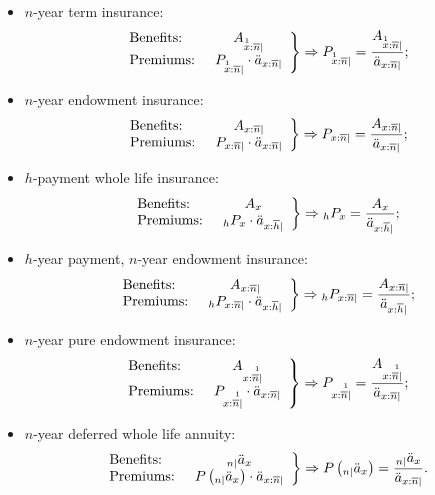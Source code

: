\documentclass[11pt,fleqn,oneside]{book}
\begin{document}
\begin{itemize}
\item $n$-year term insurance:
$$
\left.
\begin{array}{l c}
\text{Benefits: }  & A_{\stackrel{1}{x}:\overline{n}|}\\
\text{Premiums: }  & P_{\stackrel{1}{x}:\overline{n}|}\cdot \ddot{a}_{x:\overline{n}|}
\end{array}
\right\} \Rightarrow P_{\stackrel{1}{x}:\overline{n}|} = \frac{A_{\stackrel{1}{x}:\overline{n}|}}{\ddot{a}_{x:\overline{n}|}};
$$
\item $n$-year endowment insurance:
$$
\left.
\begin{array}{l c}
\text{Benefits: }  & A_{x:\overline{n}|}\\
\text{Premiums: }  &P_{x:\overline{n}|} \cdot  \ddot{a}_{x:\overline{n}|}
\end{array}
\right\} \Rightarrow P_{x:\overline{n}|} = \frac{A_{x:\overline{n}|}}{\ddot{a}_{x:\overline{n}|}};
$$
\item $h$-payment whole life insurance:\\
$$
\left.
\begin{array}{l c}
\text{Benefits: }  & A_{x}\\
\text{Premiums: }  & {_hP_{x}} \cdot \ddot{a}_{x:\overline{h}|}
\end{array}
\right\} \Rightarrow {_hP_{x}} = \frac{A_{x}}{\ddot{a}_{x:\overline{h}|}};
$$
\item $h$-year payment, $n$-year endowment insurance:
$$
\left.
\begin{array}{l c}
\text{Benefits: }  & A_{x:\overline{n}|}\\
\text{Premiums: }  & {_hP_{x:\overline{n}|}}\cdot  \ddot{a}_{x:\overline{h}|}
\end{array}
\right\} \Rightarrow {_hP_{x:\overline{n}|}} = \frac{A_{x:\overline{n}|}}{\ddot{a}_{x:\overline{h}|}};
$$
\item $n$-year pure endowment insurance:
$$
\left.
\begin{array}{l c}
\text{Benefits: }  & A_{x:\stackrel{1}{\overline{n}|}}\\
\text{Premiums: }  & P_{x:\stackrel{1}{\overline{n}|}}\cdot  \ddot{a}_{x:\overline{n}|}
\end{array}
\right\} \Rightarrow P_{x:\stackrel{1}{\overline{n}|}} = \frac{A_{x:\stackrel{1}{\overline{n}|}}}{\ddot{a}_{x:\overline{n}|}};
$$
\item $n$-year deferred whole life annuity:
$$
\left.
\begin{array}{l c}
\text{Benefits: }  & {_{n|}\ddot{a}_x}\\
\text{Premiums: }  & P\left({_{n|}\ddot{a}_x}\right) \cdot \ddot{a}_{x:\overline{n}|}
\end{array}
\right\} \Rightarrow P\left({_{n|}\ddot{a}_x}\right) = \frac{{_{n|}\ddot{a}_x}}{\ddot{a}_{x:\overline{n}|}}.
$$
\end{itemize}
\end{document}

